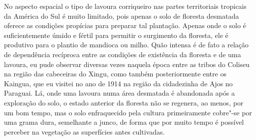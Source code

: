 No aspecto espacial o tipo de lavoura corriqueiro nas partes
territoriais tropicais da América do Sul é muito limitado, pois apenas o
solo de floresta desmatada oferece as condições propícias para preparar
tal plantação. Apenas onde o solo é suficientemente úmido e fértil para
permitir o surgimento da floresta, ele é produtivo para o plantio de
mandioca ou milho. Quão intensa é de fato a relação de dependência
recíproca entre as condições de existência da floresta e de uma lavoura,
eu pude observar diversas vezes naquela época entre as tribos do Coliseu
na região das cabeceiras do Xingu, como também posteriormente entre os
Kaingua, que eu visitei no ano de 1914 na região da cidadezinha de Ajos
no Paraguai. Lá, onde uma lavoura numa área desmatada é abandonada após
a exploração do solo, o estado anterior da floresta não se regenera, ao
menos, por um bom tempo, mas o solo enfraquecido pela cultura
primeiramente cobre"-se por uma grama dura, semelhante a junco, de forma
que por muito tempo é possível perceber na vegetação as superfícies
antes cultivadas.

